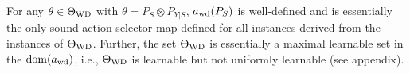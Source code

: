 For any $\theta \in \Theta_{\mathrm{WD}}$ with $\theta = P_S\otimes P_{Y|S}$, $a_{\mathrm{wd}}(P_S)$ is well-defined and is essentially the only sound action selector map defined for all instances derived from the instances of $\Theta_{\mathrm{WD}}$. Further, the set $\Theta_{\mathrm{WD}}$ is essentially a maximal learnable set in the  $\mathrm{dom}(a_{\mathrm{wd}})$, i.e., $\Theta_{\mathrm{WD}}$ is learnable but not uniformly learnable (see appendix).

